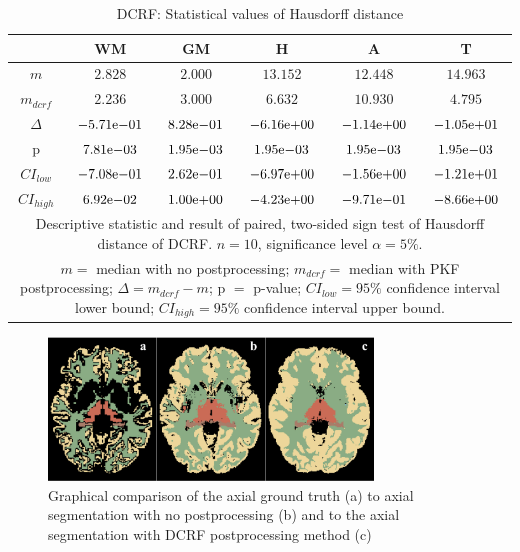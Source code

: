 \documentclass[journal]{IEEEtran}
\begin{document}
\begin{table}[h!]

\renewcommand{\arraystretch}{1.3}
\caption{DCRF: Statistical values of Hausdorff distance}
\label{tbl_dcrf_hd}
\centering
\tabcolsep=0.08cm
\begin{tabular}{c|c|c|c|c|c}
\hline
 & WM & GM & H & A & T\\
\hline
$m$&$2.828$&$2.000$&$13.15$2&$12.44$8&$14.963$\\
$m_{dcrf}$&$2.236$&$3.000$&$6.632$&$10.93$0&$4.795$\\
$\Delta$&${-5.71}\mathrm{e}{-01}$&${8.28}\mathrm{e}{-01}$&${-6.16}\mathrm{e}{+00}$&${-1.14}\mathrm{e}{+00}$&${-1.05}\mathrm{e}{+01}$\\
p&${7.81}\mathrm{e}{-03}$&${1.95}\mathrm{e}{-03}$&${1.95}\mathrm{e}{-03}$&${1.95}\mathrm{e}{-03}$&${1.95}\mathrm{e}{-03}$\\
$CI_{low}$&${-7.08}\mathrm{e}{-01}$&${2.62}\mathrm{e}{-01}$&${-6.97}\mathrm{e}{+00}$&${-1.56}\mathrm{e}{+00}$&${-1.21}\mathrm{e}{+01}$\\
$CI_{high}$	&${6.92}\mathrm{e}{-02}$&${1.00}\mathrm{e}{+00}$&${-4.23}\mathrm{e}{+00}$&${-9.71}\mathrm{e}{-01}$&${-8.66}\mathrm{e}{+00}$\\
\hline
\multicolumn{6}{p{3.4in}}{Descriptive statistic and result of paired, two-sided sign test of Hausdorff distance of DCRF. $n=10$, significance level $\alpha = 5\%$.}\\
\multicolumn{6}{p{3.4in}}{$m=$ median with no postprocessing; $m_{dcrf}=$ median with PKF postprocessing; $\Delta=m_{dcrf}-m$; p $=$ p-value;  $CI_{low}= 95\%$ confidence interval lower bound; $CI_{high}= 95\%$ confidence interval upper bound.}\\

\end{tabular}

\end{table}

\begin{figure}[ht]
\centering

\includegraphics[width=3.4in]{img/boxplots/DCRF.png}
\caption{Graphical comparison of the axial ground truth (a) to axial segmentation with no postprocessing (b) and to the axial segmentation with DCRF postprocessing method (c) }
\label{fig_dcrf}
\end{figure}
\end{document}
